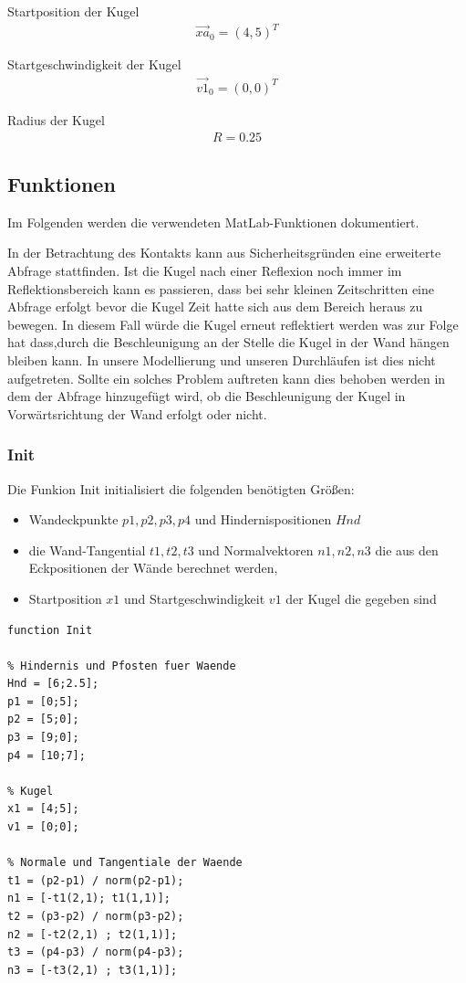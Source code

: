 \documentclass[]{scrartcl}
\begin{document}
Startposition der Kugel
\begin{align}
\vec{xa}_{0} = (4,5)^T
\end{align}

Startgeschwindigkeit der Kugel
\begin{align}
\vec{v1}_{0} = (0,0)^T
\end{align}

Radius der Kugel
\begin{align}
R = 0.25
\end{align}

\subsection{Funktionen}
Im Folgenden werden die verwendeten MatLab-Funktionen dokumentiert.


In der Betrachtung des Kontakts kann aus Sicherheitsgründen eine erweiterte Abfrage stattfinden. Ist die Kugel nach einer Reflexion noch immer im Reflektionsbereich kann es passieren, dass bei sehr kleinen Zeitschritten eine Abfrage erfolgt bevor die Kugel Zeit hatte sich aus dem Bereich heraus zu bewegen. In diesem Fall würde die Kugel erneut reflektiert werden was zur Folge hat dass,durch die Beschleunigung an der Stelle die Kugel in der Wand hängen bleiben kann. In unsere Modellierung und unseren Durchläufen ist dies nicht aufgetreten. Sollte ein solches Problem auftreten kann dies behoben werden in dem der Abfrage hinzugefügt wird, ob die Beschleunigung der Kugel in Vorwärtsrichtung der Wand erfolgt oder nicht.

\subsubsection{Init}

Die Funkion Init initialisiert die folgenden benötigten Größen:
\begin{itemize}
\item Wandeckpunkte $p1, p2, p3, p4$ und Hindernispositionen $Hnd$
\item die Wand-Tangential $t1, t2, t3$ und Normalvektoren $n1, n2, n3$ die aus den Eckpositionen der Wände berechnet werden, 
\item Startposition $x1$ und Startgeschwindigkeit $v1$ der Kugel die gegeben sind
\end{itemize}


\begin{lstlisting}
function Init

% Hindernis und Pfosten fuer Waende
Hnd = [6;2.5];
p1 = [0;5];
p2 = [5;0];
p3 = [9;0];
p4 = [10;7];

% Kugel
x1 = [4;5];
v1 = [0;0];

% Normale und Tangentiale der Waende
t1 = (p2-p1) / norm(p2-p1);
n1 = [-t1(2,1); t1(1,1)];
t2 = (p3-p2) / norm(p3-p2);
n2 = [-t2(2,1) ; t2(1,1)];
t3 = (p4-p3) / norm(p4-p3);
n3 = [-t3(2,1) ; t3(1,1)];
\end{lstlisting}
\end{document}
